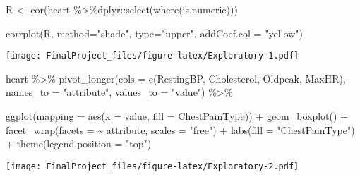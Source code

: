 \documentclass[
]{article}
\newenvironment{Shaded}{\begin{snugshade}}{\end{snugshade}}
\newcommand{\AttributeTok}[1]{\textcolor[rgb]{0.77,0.63,0.00}{#1}}
\newcommand{\FunctionTok}[1]{\textcolor[rgb]{0.00,0.00,0.00}{#1}}
\newcommand{\NormalTok}[1]{#1}
\newcommand{\OtherTok}[1]{\textcolor[rgb]{0.56,0.35,0.01}{#1}}
\newcommand{\SpecialCharTok}[1]{\textcolor[rgb]{0.00,0.00,0.00}{#1}}
\newcommand{\StringTok}[1]{\textcolor[rgb]{0.31,0.60,0.02}{#1}}
\begin{document}
\begin{Shaded}
\begin{Highlighting}[]
\NormalTok{R }\OtherTok{\textless{}{-}} \FunctionTok{cor}\NormalTok{(heart }\SpecialCharTok{\%\textgreater{}\%}\NormalTok{dplyr}\SpecialCharTok{::}\FunctionTok{select}\NormalTok{(}\FunctionTok{where}\NormalTok{(is.numeric)))}

\FunctionTok{corrplot}\NormalTok{(R, }
        \AttributeTok{method=}\StringTok{"shade"}\NormalTok{, }
        \AttributeTok{type=}\StringTok{"upper"}\NormalTok{, }
        \AttributeTok{addCoef.col =} \StringTok{"yellow"}\NormalTok{)}
\end{Highlighting}
\end{Shaded}

\texttt{[image: FinalProject\_files/figure-latex/Exploratory-1.pdf]}

\begin{Shaded}
\begin{Highlighting}[]
\NormalTok{heart }\SpecialCharTok{\%\textgreater{}\%} 
  \FunctionTok{pivot\_longer}\NormalTok{(}\AttributeTok{cols =} \FunctionTok{c}\NormalTok{(RestingBP, Cholesterol, Oldpeak, MaxHR),}
               \AttributeTok{names\_to =} \StringTok{"attribute"}\NormalTok{,}
               \AttributeTok{values\_to =} \StringTok{"value"}\NormalTok{) }\SpecialCharTok{\%\textgreater{}\%} 
  
  \FunctionTok{ggplot}\NormalTok{(}\AttributeTok{mapping =} \FunctionTok{aes}\NormalTok{(}\AttributeTok{x =}\NormalTok{ value,}
                       \AttributeTok{fill =}\NormalTok{ ChestPainType)) }\SpecialCharTok{+} 
  \FunctionTok{geom\_boxplot}\NormalTok{() }\SpecialCharTok{+} 
  \FunctionTok{facet\_wrap}\NormalTok{(}\AttributeTok{facets =} \SpecialCharTok{\textasciitilde{}}\NormalTok{ attribute,}
             \AttributeTok{scales =} \StringTok{"free"}\NormalTok{) }\SpecialCharTok{+}
  \FunctionTok{labs}\NormalTok{(}\AttributeTok{fill =} \StringTok{"ChestPainType"}\NormalTok{) }\SpecialCharTok{+}
  \FunctionTok{theme}\NormalTok{(}\AttributeTok{legend.position =} \StringTok{"top"}\NormalTok{)}
\end{Highlighting}
\end{Shaded}

\texttt{[image: FinalProject\_files/figure-latex/Exploratory-2.pdf]}
\end{document}
